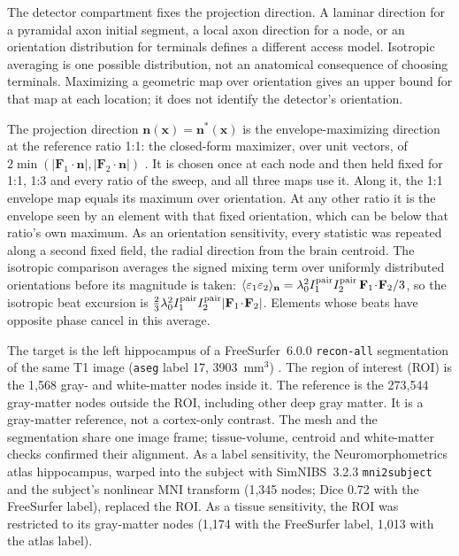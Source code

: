 \documentclass[11pt,a4paper]{article}
\begin{document}
The detector compartment fixes the projection direction. A laminar direction for a pyramidal
axon initial segment, a local axon direction for a node, or an orientation
distribution for terminals defines a different access model. Isotropic averaging
is one possible distribution, not an anatomical consequence of choosing terminals.
Maximizing a geometric map over orientation gives an upper bound for that map
at each location; it does not identify the detector's orientation.

The projection direction $\mathbf n(\mathbf x)=\mathbf n^*(\mathbf x)$ is the envelope-maximizing direction at
the reference ratio 1:1: the closed-form maximizer, over unit vectors, of
$2\min(|\mathbf F_1\!\cdot\!\mathbf n|,|\mathbf F_2\!\cdot\!\mathbf n|)$
\cite{grossman2017}. It is chosen once at each node and then held fixed for 1:1, 1:3
and every ratio of the sweep, and all three maps use it. Along it, the 1:1 envelope map
equals its maximum over orientation. At any other ratio it is the envelope seen by an
element with that fixed orientation, which can be below that ratio's own maximum. As an
orientation sensitivity, every statistic was repeated along a second fixed field, the
radial direction from the brain centroid. The isotropic comparison averages the signed
mixing term over uniformly distributed orientations before its magnitude is taken:
$\langle\varepsilon_1\varepsilon_2\rangle_{\mathbf n}
=\lambda_0^2I_1^{\rm pair}I_2^{\rm pair}\,\mathbf F_1\!\cdot\!\mathbf F_2/3$, so the
isotropic beat excursion is
$\tfrac23\lambda_0^2I_1^{\rm pair}I_2^{\rm pair}|\mathbf F_1\!\cdot\!\mathbf F_2|$.
Elements whose beats have opposite phase cancel in this average.

The target is the left hippocampus of a FreeSurfer~6.0.0 \texttt{recon-all}
segmentation of the same T1 image (\texttt{aseg} label 17, 3903~mm$^3$)
\cite{fischl2002}. The region of interest (ROI) is the 1{,}568 gray- and white-matter
nodes inside it. The reference is the 273{,}544 gray-matter nodes outside the
ROI, including other deep gray matter. It is a gray-matter reference, not a cortex-only contrast.
The mesh and the segmentation share one image frame; tissue-volume, centroid and
white-matter checks confirmed their alignment. As a label sensitivity, the
Neuromorphometrics atlas hippocampus, warped into the subject with SimNIBS~3.2.3
\texttt{mni2subject} and the subject's nonlinear MNI transform (1{,}345 nodes; Dice 0.72
with the FreeSurfer label), replaced the ROI. As a tissue sensitivity, the ROI was
restricted to its gray-matter nodes (1{,}174 with the FreeSurfer label, 1{,}013 with
the atlas label).
\end{document}
